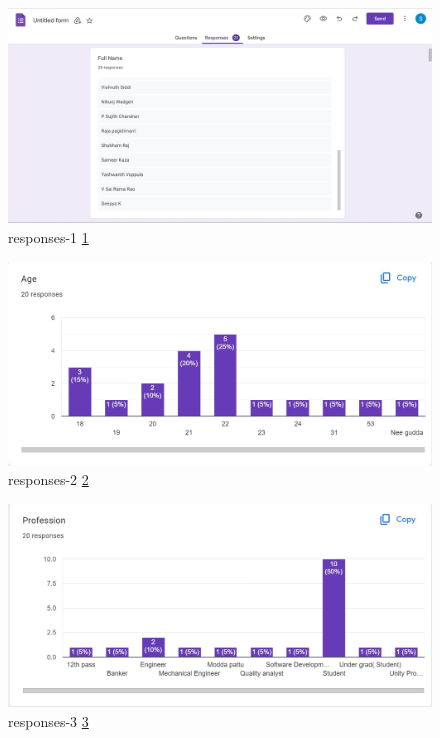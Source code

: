 \begin{figure}[H]
    \centering
    \includegraphics[scale=0.43]{Figures/responses-1.jpg}
    \caption{responses-1 \ref{fig::responses-1}}
    \label{fig::responses-1}
\end{figure}
\begin{figure}[H]
    \centering
    \includegraphics[scale=0.43]{Figures/responses-2.jpg}
    \caption{responses-2 \ref{fig::responses-2}}
    \label{fig::responses-2}
\end{figure}
\begin{figure}[H]
    \centering
    \includegraphics[scale=0.43]{Figures/responses-3.jpg}
    \caption{responses-3 \ref{fig::responses-3}}
    \label{fig::responses-3}
\end{figure}
